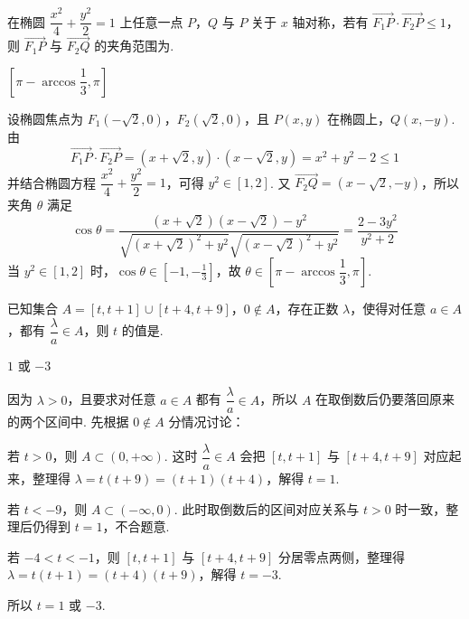 \begin{problem}
在椭圆 \(\dfrac{x^2}{4}+\dfrac{y^2}{2}=1\) 上任意一点 \(P\)，\(Q\) 与 \(P\) 关于 \(x\) 轴对称，若有 \(\overrightarrow{F_1P}\cdot\overrightarrow{F_2P}\le1\)，则 \(\overrightarrow{F_1P}\) 与 \(\overrightarrow{F_2Q}\) 的夹角范围为\fillinblank{}.
\end{problem}

\begin{answer}
\(\left[\pi-\arccos\dfrac13,\pi\right]\)
\end{answer}

\begin{solution}
设椭圆焦点为 \(F_1(-\sqrt2,0)\)，\(F_2(\sqrt2,0)\)，且 \(P(x,y)\) 在椭圆上，\(Q(x,-y)\). 由
\[
\overrightarrow{F_1P}\cdot\overrightarrow{F_2P}
=(x+\sqrt2,y)\cdot(x-\sqrt2,y)=x^2+y^2-2\le 1
\]
并结合椭圆方程 \(\dfrac{x^2}{4}+\dfrac{y^2}{2}=1\)，可得 \(y^2\in[1,2]\).
又 \(\overrightarrow{F_2Q}=(x-\sqrt2,-y)\)，所以夹角 \(\theta\) 满足
\[
\cos\theta
=\frac{(x+\sqrt2)(x-\sqrt2)-y^2}{\sqrt{(x+\sqrt2)^2+y^2}\sqrt{(x-\sqrt2)^2+y^2}}
=\frac{2-3y^2}{y^2+2}
\]
当 \(y^2\in[1,2]\) 时，\(\cos\theta\in[-1,-\tfrac13]\)，故
\(\theta\in\left[\pi-\arccos\dfrac13,\pi\right]\).
\end{solution}

\begin{problem}
已知集合 \(A=[t,t+1]\cup[t+4,t+9]\)，\(0\notin A\)，存在正数 \(\lambda\)，使得对任意 \(a\in A\)，都有 \(\dfrac{\lambda}{a}\in A\)，则 \(t\) 的值是\fillinblank{}.
\end{problem}

\begin{answer}
\(1\) 或 \(-3\)
\end{answer}

\begin{solution}
因为 \(\lambda>0\)，且要求对任意 \(a\in A\) 都有 \(\dfrac{\lambda}{a}\in A\)，所以 \(A\) 在取倒数后仍要落回原来的两个区间中. 先根据 \(0\notin A\) 分情况讨论：

若 \(t>0\)，则 \(A\subset(0,+\infty)\). 这时 \(\dfrac{\lambda}{a}\in A\) 会把 \([t,t+1]\) 与 \([t+4,t+9]\) 对应起来，整理得 \(\lambda=t(t+9)=(t+1)(t+4)\)，解得 \(t=1\).

若 \(t<-9\)，则 \(A\subset(-\infty,0)\). 此时取倒数后的区间对应关系与 \(t>0\) 时一致，整理后仍得到 \(t=1\)，不合题意.

若 \(-4<t<-1\)，则 \([t,t+1]\) 与 \([t+4,t+9]\) 分居零点两侧，整理得 \(\lambda=t(t+1)=(t+4)(t+9)\)，解得 \(t=-3\).

所以 \(t=1\) 或 \(-3\).
\end{solution}
